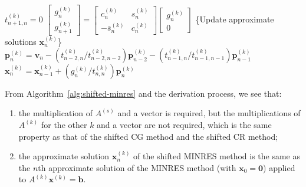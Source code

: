 \begin{algorithm}[H]
\begin{algorithmic}[1]
\State $t_{n+1,n}^{(k)}=0$
\State $\begin{bmatrix}g_n^{(k)}\\g_{n+1}^{(k)}\end{bmatrix}=\begin{bmatrix}c_n^{(k)}&s_n^{(k)}\\-\bar s_n^{(k)}&c_n^{(k)}\end{bmatrix}\begin{bmatrix}g_n^{(k)}\\0\end{bmatrix}$
\State \{{Update approximate solutions $\bm x_n^{(k)}$}\}
\State $\bm p_n^{(k)}=\bm v_n-(t_{n-2,n}^{(k)}/t_{n-2,n-2}^{(k)})\bm p_{n-2}^{(k)}-(t_{n-1,n}^{(k)}/t_{n-1,n-1}^{(k)})\bm p_{n-1}^{(k)}$
\State $\bm x_n^{(k)}=\bm x_{n-1}^{(k)}+(g_n^{(k)}/t_{n,n}^{(k)})\bm p_n^{(k)}$
\EndIf\EndFor
{}
\EndFor\end{algorithmic}\end{algorithm}
{From Algorithm\ \ref{alg:shifted-minres} and the derivation process, we see that:}
\begin{enumerate}
\item {the multiplication of $A^{(s)}$ and a vector is required, but the multiplications of $A^{(k)}$ for the other $k$ and a vector are not required, which is the same property as that of the shifted CG method and the shifted CR method;}
\item {the approximate solution $\bm x_n^{(k)}$ of the shifted MINRES method is the same as the $n$th approximate solution of the MINRES method (with $\bm x_0=\bm0$) applied to $A^{(k)}\bm x^{(k)}=\bm b$.}
\end{enumerate}
